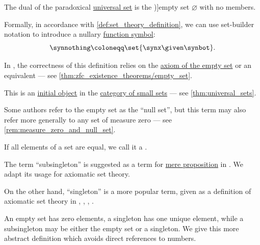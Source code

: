 \begin{definition}\label{def:empty_set}
  The dual of the paradoxical \hyperref[def:universal_set]{universal set} is the \term[ru=пустое множество (\cite[6]{ШеньВерещагин2020НачалаТеорииМножеств})]{empty set} \( \varnothing \) with no members.

  Formally, in accordance with \cref{def:set_theory_definition}, we can use set-builder notation to introduce a nullary \hyperref[def:fol_signature/function]{function symbol}:
  \begin{equation*}
    \synnothing \coloneqq \set{ \synx \given \synbot }.
  \end{equation*}
\end{definition}
\begin{comments}
  \item In \hyperref[def:zfc]{}, the correctness of this definition relies on the \hyperref[def:zfc/empty_set]{axiom of the empty set} or an equivalent --- see \cref{thm:zfc_existence_theorems/empty_set}.

  \item This is an \hyperref[def:universal_objects/initial]{initial object} in the \hyperref[def:category_of_small_sets]{category of small sets} --- see \cref{thm:universal_sets}.

  \item Some authors refer to the empty set as the \enquote{null set}, but this term may also refer more generally to any set of measure zero --- see \cref{rem:measure_zero_and_null_set}.
\end{comments}

\begin{definition}\label{def:subsingleton_set}
  If all elements of a set are equal, we call it a .
\end{definition}
\begin{comments}
  \item The term \enquote{subsingleton} is suggested as a term for \hyperref[def:mere_proposition]{mere proposition} in \cite[112]{UnivalentFoundationsProgram2013HoTT}. We adapt its usage for axiomatic set theory.

  On the other hand, \enquote{singleton} is a more popular term, given as a definition of axiomatic set theory in
  \cite[10]{Halmos1960NaiveSetTheory},
  \cite[7]{Jech2006SetTheory},
  \cite[3]{Kelley1975GeneralTopology},
  \cite[129]{КолмогоровДрагалин2006ЛогикаВведение}.

  \item An empty set has zero elements, a singleton has one unique element, while a subsingleton may be either the empty set or a singleton. We give this more abstract definition which avoids direct references to numbers.
\end{comments}

